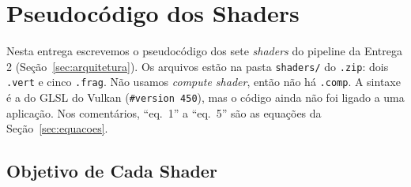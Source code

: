 
\renewcommand{\lstlistingname}{Código}

\section{Pseudocódigo dos Shaders}
\label{sec:pseudocodigo}
\sloppy

Nesta entrega escrevemos o pseudocódigo dos sete \textit{shaders} do pipeline da Entrega 2 (Seção~\ref{sec:arquitetura}). Os arquivos estão na pasta \texttt{shaders/} do \texttt{.zip}: dois \texttt{.vert} e cinco \texttt{.frag}. Não usamos \textit{compute shader}, então não há \texttt{.comp}. A sintaxe é a do GLSL do Vulkan (\texttt{\#version 450}), mas o código ainda não foi ligado a uma aplicação. Nos comentários, ``eq.~1'' a ``eq.~5'' são as equações da Seção~\ref{sec:equacoes}.

\subsection{Objetivo de Cada Shader}

